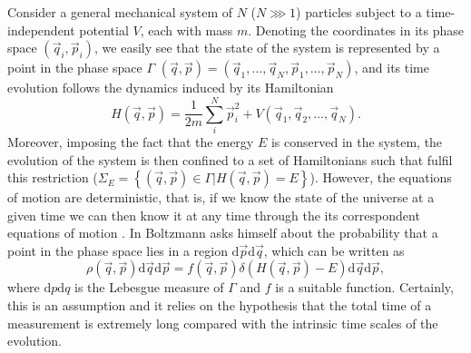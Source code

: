 \indent Consider a general mechanical system of $N$ ($N \ggg 1$) particles subject to a time-independent potential $V$, each with mass $m$.  Denoting the coordinates in its phase space $(\vec{q}_i,\vec{p}_i)$, we easily see that the state of the system is represented by a point in the phase space $\Gamma$ $(\vec{q},\vec{p})=(\vec{q}_{1},\ldots,\vec{q}_{N},\vec{p}_{1},\ldots,\vec{p}_{N})$, and its time evolution follows the dynamics induced by its Hamiltonian
\begin{equation}
H(\vec{q},\vec{p}) = \frac{1}{2m}\sum_{i}^{N} \vec{p}_{i}^{2} + V(\vec{q}_{1},\vec{q}_{2},\ldots,\vec{q}_{N}).
\label{CH1:Hamiltonian_time_independent}
\end{equation}
Moreover, imposing the fact that the energy $E$ is conserved in the system, the evolution of the system is then confined to a set of Hamiltonians such that fulfil this restriction ($\Sigma_{E}=\left\{(\vec{q},\vec{p})\in \Gamma | H(\vec{q},\vec{p})=E\right\}$). However, the equations of motion are deterministic, that is, if we know the state of the universe at a given time we can then know it at any time through the its correspondent equations of motion \cite{koznjak_who_2015}. In \cite{boltzmann1866mechanische} Boltzmann asks himself about the probability that a point in the phase space lies in a region $\mathrm{d}\vec{p}\mathrm{d}\vec{q}$, which can be written as
\begin{equation}
\rho(\vec{q}, \vec{p}) \mathrm{d} \vec{q} \mathrm{d} \vec{p}=f(\vec{q}, \vec{p}) \delta(H(\vec{q}, \vec{p})-E) \mathrm{d} \vec{q} \mathrm{d} \vec{p},
\end{equation}
where $\mathrm{d}p\mathrm{d}q$ is the Lebesgue measure of $\Gamma$ and $f$ is a suitable function. Certainly, this is an assumption and it relies on the hypothesis that the total time of a measurement is extremely long compared with the intrinsic time scales of the evolution.\\
